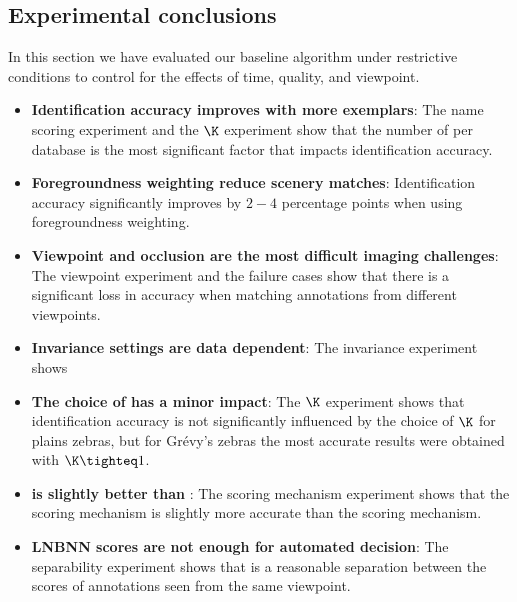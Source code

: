    \subsection{Experimental conclusions}
        In this section we have evaluated our baseline algorithm under restrictive conditions to control for the
          effects of time, quality, and viewpoint.
        \begin{itemize}
            \item \textbf{Identification accuracy improves with more exemplars}:
                The name scoring experiment and the $\K$ experiment show that the number of \exemplars{} per database
                  \name{} is the most significant factor that impacts identification accuracy.
                
            \item \textbf{Foregroundness weighting reduce scenery matches}:
                Identification accuracy significantly improves by $2-4$ percentage points when using foregroundness
                  weighting.
                
            \item \textbf{Viewpoint and occlusion are the most difficult imaging challenges}:
                The viewpoint experiment and the failure cases show that there is a significant loss in accuracy when
                  matching annotations from different viewpoints.
                
            \item \textbf{Invariance settings are data dependent}:
                The invariance experiment shows
            \item \textbf{The choice of \K{} has a minor impact}: 
                The $\K$ experiment shows that identification accuracy is not significantly influenced by the choice
                  of $\K$ for plains zebras, but for Grévy's zebras the most accurate results were obtained with
                  $\K\tighteq1$.
            \item \textbf{\Nsumprefix{} is slightly better than \csumprefix{} \namescoring{}}:
                The scoring mechanism experiment shows that the \nsumprefix{} scoring mechanism is slightly more
                  accurate than the \csumprefix{} scoring mechanism.
                
            \item \textbf{LNBNN scores are not enough for automated decision}:
                The separability experiment shows that is a reasonable separation between the scores of annotations
                  seen from the same viewpoint.
        \end{itemize}
        
